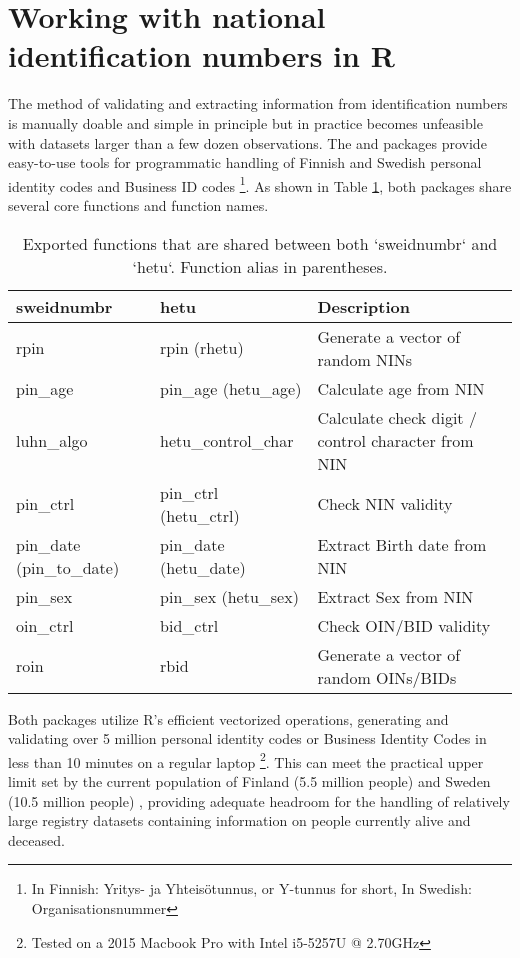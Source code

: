 \section{Working with national identification numbers in R}\label{working-with-national-identification-numbers-in-r}

The method of validating and extracting information from identification numbers is manually doable and simple in principle but in practice becomes unfeasible with datasets larger than a few dozen observations. The  and  packages provide easy-to-use tools for programmatic handling of Finnish and Swedish personal identity codes and Business ID codes \footnote{In Finnish: Yritys- ja Yhteisötunnus, or Y-tunnus for short, In Swedish: Organisationsnummer}. As shown in Table \ref{tab:function-table}, both packages share several core functions and function names.

\begin{table}[!h]
\centering
\caption{\label{tab:function-table}Exported functions that are shared between both `sweidnumbr` and `hetu`. Function alias in parentheses.}
\centering
\begin{tabular}[t]{lll}
\toprule
sweidnumbr & hetu & Description\\
\midrule
rpin & rpin (rhetu) & Generate a vector of random NINs\\
pin\_age & pin\_age (hetu\_age) & Calculate age from NIN\\
luhn\_algo & hetu\_control\_char & Calculate check digit / control character from NIN\\
pin\_ctrl & pin\_ctrl (hetu\_ctrl) & Check NIN validity\\
pin\_date (pin\_to\_date) & pin\_date (hetu\_date) & Extract Birth date from NIN\\
\addlinespace
pin\_sex & pin\_sex (hetu\_sex) & Extract Sex from NIN\\
oin\_ctrl & bid\_ctrl & Check OIN/BID validity\\
roin & rbid & Generate a vector of random OINs/BIDs\\
\bottomrule
\end{tabular}
\end{table}

Both packages utilize R's efficient vectorized operations, generating and validating over 5 million personal identity codes or Business Identity Codes in less than 10 minutes on a regular laptop \footnote{Tested on a 2015 Macbook Pro with Intel i5-5257U @ 2.70GHz}. This can meet the practical upper limit set by the current population of Finland (5.5 million people) \citep{svt2022} and Sweden (10.5 million people) \citep{scb2022}, providing adequate headroom for the handling of relatively large registry datasets containing information on people currently alive and deceased.

